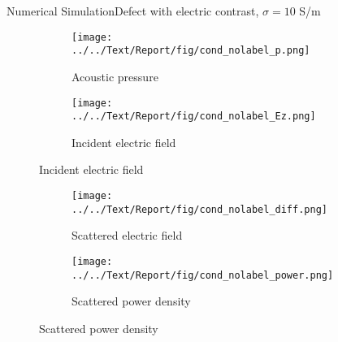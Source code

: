 \documentclass[11pt, final]{beamer}
\begin{document}
	\begin{frame}{Numerical Simulation}{Defect with electric contrast, $\sigma = 10$ S/m}
		\begin{figure}
			\centering
			\begin{subfigure}[t]{0.5\textheight}
				\vspace{-1cm}
				\caption*{\hspace{0.5cm}Acoustic pressure}
				\vspace{-0.2cm}
				\texttt{[image: ../../Text/Report/fig/cond\_nolabel\_p.png]}
			\end{subfigure}
			\begin{subfigure}[t]{0.5\textheight}
				\vspace{-1cm}
				\caption*{\hspace{0.5cm}Incident electric field}
				\vspace{-0.2cm}
				\texttt{[image: ../../Text/Report/fig/cond\_nolabel\_Ez.png]}
			\end{subfigure}
		\end{figure}
		
		\begin{figure}
			\centering
			\vspace{-0.4cm}
			\begin{subfigure}[t]{0.5\textheight}
				\texttt{[image: ../../Text/Report/fig/cond\_nolabel\_diff.png]}
				\vspace{-0.1cm}
				\caption*{\hspace{0.5cm}Scattered electric field}
			\end{subfigure}
			\begin{subfigure}[t]{0.5\textheight}
				\texttt{[image: ../../Text/Report/fig/cond\_nolabel\_power.png]}
				\vspace{-0.1cm}
				\caption*{\hspace{0.5cm}Scattered power density}
			\end{subfigure}
		\end{figure}
	\end{frame}
	
\end{document}
